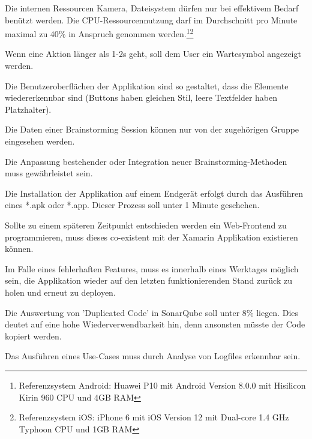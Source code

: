 \begin{description}[leftmargin=!,labelwidth=\widthof{\bfseries Wiederverwendbarkeit}]
	\item[Ressourcennutzung] Die internen Ressourcen Kamera, Dateisystem dürfen nur bei effektivem Bedarf benützt werden. Die CPU-Ressourcen\-nutzung darf im Durchschnitt pro Minute maximal zu 40\% in Anspruch genommen werden.\footnote{Referenzsystem Android: Huawei P10 mit Android Version 8.0.0 mit Hisilicon Kirin 960 CPU und 4GB RAM}\footnote{Referenzsystem iOS: iPhone 6 mit iOS Version 12 mit Dual-core 1.4 GHz Typhoon CPU und 1GB RAM}
	
	\item[Bedienbarkeit] Wenn eine Aktion länger als 1-2s geht, soll dem User ein Wartesymbol angezeigt werden. 
	
	\item[Ästhetik] Die Benutzeroberflächen der Applikation sind so gestaltet, dass die Elemente wiedererkennbar sind (Buttons haben gleichen Stil, leere Textfelder haben Platzhalter). 
	
	\item[Vertraulichkeit] Die Daten einer Brainstorming Session können nur von der zugehörigen Gruppe eingesehen werden. 
	
	\item[Anpassbarkeit] Die Anpassung bestehender oder Integration neuer Brain\-storming-Methoden muss gewährleistet sein.
	
	\item[Installierbarkeit] Die Installation der Applikation auf einem Endgerät erfolgt durch das Ausführen eines *.apk oder *.app. Dieser Prozess soll unter 1 Minute geschehen.
	
	\item[Co-Existenz] Sollte zu einem späteren Zeitpunkt entschieden werden ein Web-Frontend zu programmieren, muss dieses co-existent mit der Xamarin Applikation existieren können.
	
	\item[Wiederherstellbarkeit] Im Falle eines fehlerhaften Features, muss es innerhalb eines Werktages möglich sein, die Applikation wieder auf den letzten funktionierenden Stand zurück zu holen und erneut zu deployen.	
	
	\item[Wiederverwendbarkeit] Die Auswertung von 'Duplicated Code' in SonarQube soll unter 8\% liegen. Dies deutet auf eine hohe Wiederverwendbarkeit hin, denn ansonsten müsste der Code kopiert werden. 
	
	\item[Analysierbarkeit] Das Ausführen eines Use-Cases muss durch Analyse von Logfiles erkennbar sein.
\end{description}
